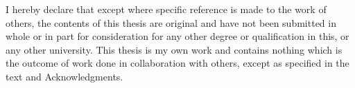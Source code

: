 \begin{declaration}
I hereby declare that except where specific reference is made to the work of
others, the contents of this thesis are original and have not been
submitted in whole or in part for consideration for any other degree or
qualification in this, or any other university. This thesis is my own
work and contains nothing which is the outcome of work done in collaboration
with others, except as specified in the text and Acknowledgments.

\end{declaration}





